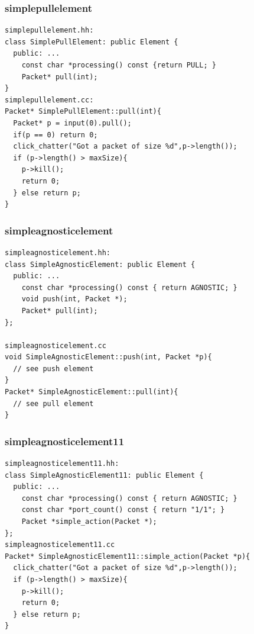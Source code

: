 \documentclass{beamer}
\begin{document}
\begin{frame}[fragile]
\frametitle{simplepullelement}
\begin{lstlisting}[basicstyle=\footnotesize]
simplepullelement.hh:
class SimplePullElement: public Element { 
  public: ...
    const char *processing() const {return PULL; }
    Packet* pull(int);
}
simplepullelement.cc:
Packet* SimplePullElement::pull(int){
  Packet* p = input(0).pull();
  if(p == 0) return 0;
  click_chatter("Got a packet of size %d",p->length());
  if (p->length() > maxSize){
    p->kill();
    return 0;
  } else return p;
}
\end{lstlisting}
\end{frame}

\begin{frame}[fragile]
\frametitle{simpleagnosticelement}
\begin{lstlisting}[basicstyle=\footnotesize,emph={AGNOSTIC},emphstyle=\underbar]
simpleagnosticelement.hh:
class SimpleAgnosticElement: public Element { 
  public: ...
    const char *processing() const { return AGNOSTIC; }
    void push(int, Packet *);
    Packet* pull(int);
};

simpleagnosticelement.cc
void SimpleAgnosticElement::push(int, Packet *p){
  // see push element
}
Packet* SimpleAgnosticElement::pull(int){
  // see pull element
}
\end{lstlisting}
\end{frame}

\begin{frame}[fragile]
\frametitle{simpleagnosticelement11}
\begin{lstlisting}[basicstyle=\footnotesize, emph={AGNOSTIC,simple_action},emphstyle=\underbar]
simpleagnosticelement11.hh:
class SimpleAgnosticElement11: public Element { 
  public: ...
    const char *processing() const { return AGNOSTIC; }
    const char *port_count() const { return "1/1"; }
    Packet *simple_action(Packet *);
};
simpleagnosticelement11.cc
Packet* SimpleAgnosticElement11::simple_action(Packet *p){
  click_chatter("Got a packet of size %d",p->length());
  if (p->length() > maxSize){
    p->kill();
    return 0;
  } else return p;
}
\end{lstlisting}
\end{frame}
\end{document}
